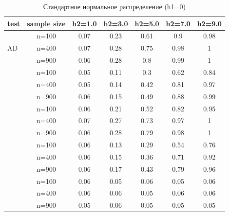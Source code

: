 \documentclass[12pt]{article}
\theoremstyle{break}
\begin{document}
\begin{table}[!h]
	\centering
	\caption{Стандартное нормальное распределение (h1=0) }
	\begin{tabular}{l c c c c c c} 
		\toprule
		test & sample size & h2=1.0 & h2=3.0 & h2=5.0 & h2=7.0 & h2=9.0 \\ 
		\midrule
		\multirow{3}{*}{AD} 
		& n=100 & 0.07 & 0.23 & 0.61 & 0.9 & 0.98 \\ 
		& n=400 & 0.07 & 0.28 & 0.75 & 0.98 & 1 \\ 
		& n=900 & 0.06 & 0.28 & 0.8 & 0.99 & 1 \\ 
		\addlinespace
		\addlinespace
		\multirow{3}{*}{CM} 
		& n=100 & 0.05 & 0.11 & 0.3 & 0.62 & 0.84 \\ 
		& n=400 & 0.05 & 0.14 & 0.42 & 0.81 & 0.97 \\ 
		& n=900 & 0.06 & 0.15 & 0.49 & 0.88 & 0.99 \\ 
		\addlinespace
		\addlinespace
		\multirow{3}{*}{ET} 
		& n=100 & 0.06 & 0.21 & 0.52 & 0.82 & 0.95 \\ 
		& n=400 & 0.07 & 0.27 & 0.73 & 0.97 & 1 \\ 
		& n=900 & 0.06 & 0.28 & 0.79 & 0.98 & 1 \\ 
		\addlinespace
		\addlinespace
		\multirow{3}{*}{KS} 
		& n=100 & 0.06 & 0.13 & 0.29 & 0.54 & 0.76 \\ 
		& n=400 & 0.06 & 0.15 & 0.36 & 0.71 & 0.92 \\ 
		& n=900 & 0.06 & 0.17 & 0.43 & 0.79 & 0.96 \\ 
		\addlinespace
		\addlinespace
		\multirow{3}{*}{WMW} 
		& n=100 & 0.06 & 0.05 & 0.06 & 0.05 & 0.06 \\ 
		& n=400 & 0.06 & 0.06 & 0.05 & 0.06 & 0.06 \\ 
		& n=900 & 0.05 & 0.06 & 0.05 & 0.05 & 0.05 \\ 
		\bottomrule
	\end{tabular}
	\label{tbl:normal_pow_vs_h2}
\end{table}



\newpage
\end{document}
